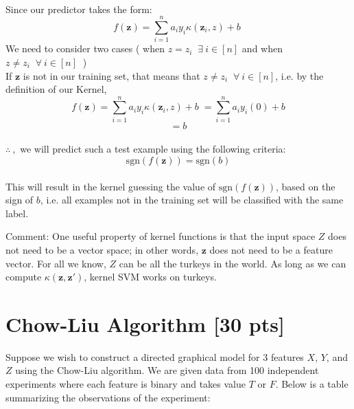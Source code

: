 \documentclass[a4paper]{article}
\theoremstyle{definition}
\newenvironment{soln}{
    \leavevmode\color{blue}\ignorespaces
}{}
\begin{document}
\begin{enumerate}
\begin{soln}
    \\Since our predictor takes the form:
    \[ f(\mathbf z)=\sum_{i=1}^na_iy_i\kappa(\mathbf z_i,z) +b\; \]
    We need to consider two cases ( when $z = z_i \;\;\exists\: i \in [n]$ and when $z \neq z_i \;\;\forall\: i \in [n]\;\;$)
    \\If $\mathbf z$ is not in our training set, that means that $z \neq z_i \;\;\forall\: i \in [n]$, i.e. by the definition of our Kernel,
    \[ f(\mathbf z)=\sum_{i=1}^na_iy_i\kappa(\mathbf z_i,z) +b\; = \sum_{i=1}^na_iy_i(0) +b\]
    \[ = b\]
    \\ $\therefore\:,$ we will predict such a test example using the following criteria:
    \[ \mathrm{sgn}(f(\mathbf z)) = \mathrm{sgn}(b)\]
    \\ This will result in the kernel guessing the value of $\mathrm{sgn}(f(\mathbf z))$, based on the sign of $b$, i.e. all examples not in the training set will be classified with the same label.
\end{soln}
\end{enumerate}

Comment: One useful property of kernel functions is that the input space $Z$ does not need to be a vector space; in
other words, $\mathbf z$ does not need to be a feature vector. For all we know, $Z$ can be all the turkeys in the world. As long as we
can compute $\kappa(\mathbf z, \mathbf z')$, kernel SVM works on turkeys.

\section{Chow-Liu Algorithm [30 pts]}
Suppose we wish to construct a directed graphical model for 3 features $X$, $Y$, and $Z$ using the Chow-Liu algorithm. We are given data from 100 independent experiments where each feature is binary and takes value $T$ or $F$. Below is a table summarizing the observations of the experiment:
\end{document}
